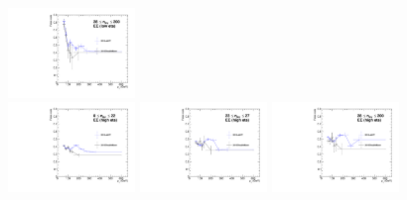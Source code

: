 \begin{figure}[!htbp]
\includegraphics[width=0.3\textwidth]{fig/compare_pv_EE1_2016_28to200.pdf}\\
\includegraphics[width=0.3\textwidth]{fig/compare_pv_EE2_2016_0to22.pdf}
\includegraphics[width=0.3\textwidth]{fig/compare_pv_EE2_2016_23to27.pdf}
\includegraphics[width=0.3\textwidth]{fig/compare_pv_EE2_2016_28to200.pdf}

\label{fig:frpileup_compare_dataset_2016}
\end{figure}

